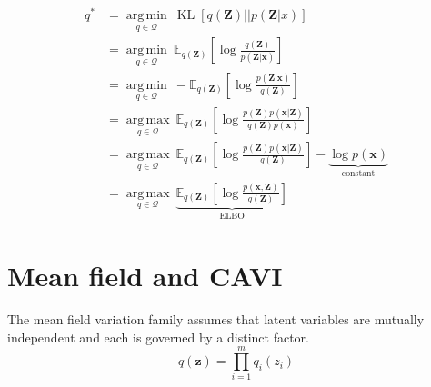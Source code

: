 \documentclass[11pt]{article}
\DeclareMathOperator*{\argmin}{arg\,min}
\DeclareMathOperator*{\argmax}{arg\,max}
\DeclareMathOperator{\KL}{KL}
\newcommand{\x}{\ensuremath{\mathbf x}}
\newcommand{\z}{\ensuremath{\mathbf z}}
\newcommand{\Z}{\ensuremath{\mathbf Z}}
\begin{document}
\begin{subequations}
\begin{align}
q^* &= \underset{q \in \mathcal Q}{\argmin} ~ \KL\left[q(\Z) || p(\Z|x) \right] \\
 &= \underset{q \in \mathcal Q}{\argmin} ~ \mathbb E_{q(\Z)}\left[\log \frac{q(\Z)}{p(\Z|\x)}  \right] \\
 &= \underset{q \in \mathcal Q}{\argmin} ~ - \mathbb E_{q(\Z)}\left[\log \frac{p(\Z|\x)}{q(\Z)}  \right] \\
 &= \underset{q \in \mathcal Q}{\argmax} ~ \mathbb E_{q(\Z)}\left[\log \frac{p(\Z)p(\x|\Z)}{q(\Z)p(\x)}  \right] \\
 &= \underset{q \in \mathcal Q}{\argmax} ~ \mathbb E_{q(\Z)}\left[\log \frac{p(\Z)p(\x|\Z)}{q(\Z)} \right] - \underbrace{\log p(\x)}_{\text{constant}} \\ 
 &= \underset{q \in \mathcal Q}{\argmax} ~ \underbrace{\mathbb E_{q(\Z)}\left[\log \frac{p(\x, \Z)}{q(\Z)} \right]}_{\text{ELBO}} 
\end{align}
\end{subequations}

\section{Mean field and CAVI}

The mean field variation family assumes that latent variables are mutually independent and each is governed by a distinct factor.
\begin{equation}\label{eq:mean-field}
q(\z) = \prod_{i=1}^m q_i(z_i)
\end{equation}
\end{document}
